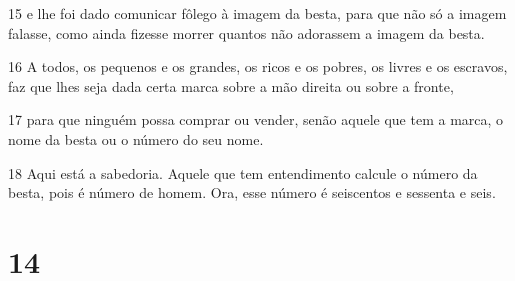 \par 15 e lhe foi dado comunicar fôlego à imagem da besta, para que não só a imagem falasse, como ainda fizesse morrer quantos não adorassem a imagem da besta.
\par 16 A todos, os pequenos e os grandes, os ricos e os pobres, os livres e os escravos, faz que lhes seja dada certa marca sobre a mão direita ou sobre a fronte,
\par 17 para que ninguém possa comprar ou vender, senão aquele que tem a marca, o nome da besta ou o número do seu nome.
\par 18 Aqui está a sabedoria. Aquele que tem entendimento calcule o número da besta, pois é número de homem. Ora, esse número é seiscentos e sessenta e seis.

\chapter{14}

